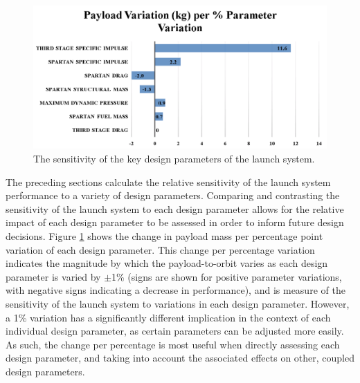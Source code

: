 \begin{figure}[ht!]
	\centering
	\includegraphics[width=0.99\linewidth]{figures/5_Ascent/BarChartRelativePayloadChange}
	\caption{The sensitivity of the key design parameters of the launch system.}
	\label{fig:BarChartRelativePayloadChange}
\end{figure}

The preceding sections calculate the relative sensitivity of the launch system performance to a variety of design parameters. 
Comparing and contrasting the sensitivity of the launch system to each design parameter allows for the relative impact of each design parameter to be assessed in order to inform future design decisions. 
Figure \ref{fig:BarChartRelativePayloadChange} shows the change in payload mass per percentage point variation of each design parameter. 
This change per percentage variation indicates the magnitude by which the payload-to-orbit varies as each design parameter is varied by $\pm$1\% (signs are shown for positive parameter variations, with negative signs indicating a decrease in performance), and is measure of the sensitivity of the launch system to variations in each design parameter. 
However, a 1\% variation has a significantly different implication in the context of each individual design parameter, as certain parameters can be adjusted more easily. 
As such, the change per percentage is most useful when directly assessing each design parameter, and taking into account the associated effects on other, coupled design parameters. 

